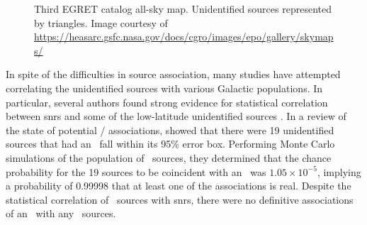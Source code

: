 \begin{figure}[h!]%
	\centering
	\caption{Third EGRET catalog all-sky map. Unidentified sources represented by triangles. Image courtesy of \url{https://heasarc.gsfc.nasa.gov/docs/cgro/images/epo/gallery/skymaps/}}
	\label{fig:3EGSky} 
\end{figure}

In spite of the difficulties in \egret{} source association, many studies have attempted correlating the unidentified \egret{} sources with various Galactic populations. In particular, several authors found strong evidence for statistical correlation between \glspl{snr} and some of the low-latitude unidentified sources \citep{Sturner95, Esposito96, Romero99}. In a review of the state of potential \snr{} /  \egret{} associations, \cite{Torres03} showed that there were 19 unidentified \egret{} sources that had an \snr~fall within its 95\% error box. Performing Monte Carlo simulations of the population of  \egret~sources, they determined that the chance probability for the 19 sources to be coincident with an \snr~was $1.05 \times 10^{-5}$, implying a probability of 0.99998 that at least one of the associations is real. Despite the statistical correlation of \egret~sources with \glspl{snr}, there were no definitive associations of an \snr~with any \egret~sources.

